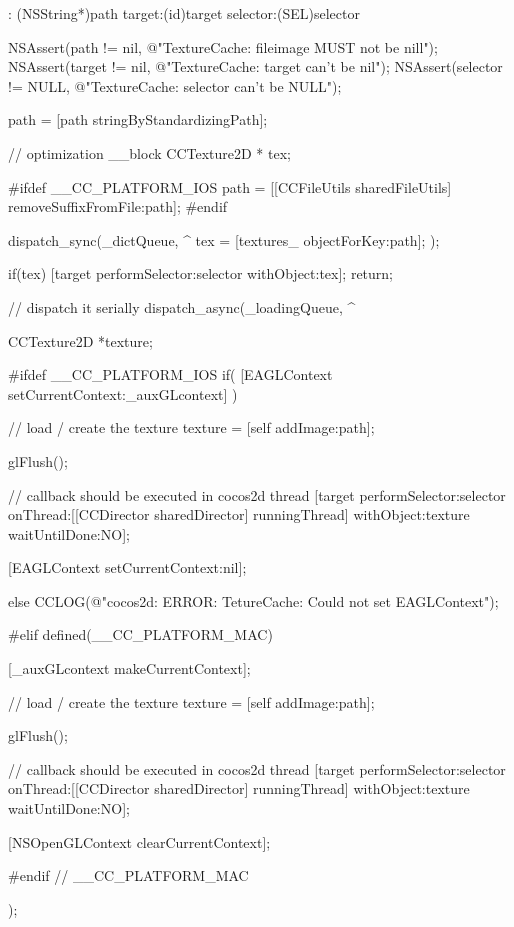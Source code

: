 \begin{DoxyCode}
                     : (NSString*)path target:(id)target selector:(SEL)selector
{
        NSAssert(path != nil, @"TextureCache: fileimage MUST not be nill");
        NSAssert(target != nil, @"TextureCache: target can't be nil");
        NSAssert(selector != NULL, @"TextureCache: selector can't be NULL");

        path = [path stringByStandardizingPath];

        // optimization
        __block CCTexture2D * tex;

#ifdef __CC_PLATFORM_IOS
        path = [[CCFileUtils sharedFileUtils] removeSuffixFromFile:path];
#endif

        dispatch_sync(_dictQueue, ^{
                tex = [textures_ objectForKey:path];
        });

        if(tex) {
                [target performSelector:selector withObject:tex];
                return;
        }

        // dispatch it serially
        dispatch_async(_loadingQueue, ^{

                CCTexture2D *texture;

#ifdef __CC_PLATFORM_IOS
                if( [EAGLContext setCurrentContext:_auxGLcontext] ) {

                        // load / create the texture
                        texture = [self addImage:path];

                        glFlush();

                        // callback should be executed in cocos2d thread
                        [target performSelector:selector onThread:[[CCDirector 
      sharedDirector] runningThread] withObject:texture waitUntilDone:NO];

                        [EAGLContext setCurrentContext:nil];
                } else {
                        CCLOG(@"cocos2d: ERROR: TetureCache: Could not set
       EAGLContext");
                }

#elif defined(__CC_PLATFORM_MAC)

                [_auxGLcontext makeCurrentContext];

                // load / create the texture
                texture = [self addImage:path];

                glFlush();

                // callback should be executed in cocos2d thread
                [target performSelector:selector onThread:[[CCDirector 
      sharedDirector] runningThread] withObject:texture waitUntilDone:NO];

                [NSOpenGLContext clearCurrentContext];

#endif // __CC_PLATFORM_MAC

        });
}
\end{DoxyCode}
